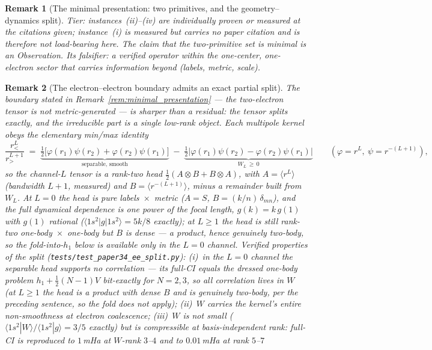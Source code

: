 \documentclass[11pt]{article}
\newtheorem{remark}{Remark}
\begin{document}
\begin{remark}[The minimal presentation: two primitives, and the
geometry--dynamics split]
\emph{Tier:} instances~(ii)--(iv) are individually proven or
measured \emph{at the citations given}; instance~(i) is measured but
carries no paper citation and is therefore not load-bearing here.  The
claim that the two-primitive set is \emph{minimal} is an Observation.  Its
falsifier: a verified operator within the one-center, one-electron
sector that carries information beyond (labels, metric, scale).
\end{remark}

\begin{remark}[The electron--electron boundary admits an exact partial
split]
\label{rem:ee_partial_split}
The boundary stated in Remark~\ref{rem:minimal_presentation} --- the
two-electron tensor is not metric-generated --- is sharper than a
residual: the tensor splits \emph{exactly}, and the irreducible part
is a single low-rank object.  Each multipole kernel obeys the
elementary min/max identity
\[
  \frac{r_<^{L}}{r_>^{L+1}}
  \;=\;
  \underbrace{\tfrac12\bigl[\varphi(r_1)\psi(r_2)
      + \varphi(r_2)\psi(r_1)\bigr]}_{\text{separable, smooth}}
  \;-\;
  \underbrace{\tfrac12\bigl|\varphi(r_1)\psi(r_2)
      - \varphi(r_2)\psi(r_1)\bigr|}_{W_L \,\ge\, 0}
  \qquad (\varphi = r^{L},\ \psi = r^{-(L+1)}),
\]
so the channel-$L$ tensor is a \emph{rank-two} head
$\tfrac12(A \otimes B + B \otimes A)$, with $A = \langle r^{L}\rangle$
(bandwidth $L+1$, measured) and $B = \langle r^{-(L+1)}\rangle$, minus
a remainder built from $W_L$.  At $L=0$ the head is pure
labels~$\times$~metric ($A = S$, $B = (k/n)\,\delta_{mn}$), and the
full dynamical dependence is one power of the focal length,
$g(k) = k\,g(1)$ with $g(1)$ rational
($\langle 1s^2|g|1s^2\rangle = 5k/8$ exactly); at $L \ge 1$ the head
is still rank-two one-body~$\times$~one-body but
$B$ is dense --- a \emph{product}, hence genuinely two-body, so the
fold-into-$h_1$ below is available only in the $L=0$ channel.  Verified properties of the split
(\texttt{tests/test\_paper34\_ee\_split.py}): (i)~in the $L=0$ channel the separable head
supports \emph{no correlation} --- its full-CI equals the dressed
one-body problem $h_1 + \tfrac12(N{-}1)V$ bit-exactly for $N = 2,3$,
so all correlation lives in $W$ (at $L \ge 1$ the head is a product
with dense $B$ and is genuinely two-body, per the preceding
sentence, so the fold does not apply); (ii)~$W$ carries the kernel's entire
non-smoothness at electron coalescence; (iii)~$W$ is not small
($\langle 1s^2|W\rangle/\langle 1s^2|g\rangle = 3/5$ exactly) but is
\emph{compressible at basis-independent rank}: full-CI is reproduced
to $1$\,mHa at $W$-rank $3$--$4$ and to $0.01$\,mHa at rank $5$--$7$

\end{remark}
\end{document}
